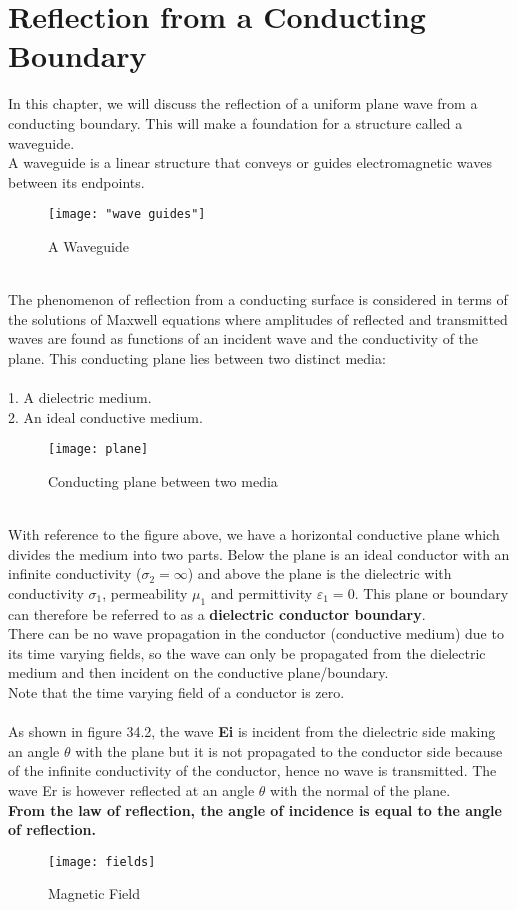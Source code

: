 \chapter{Reflection from a Conducting Boundary}
In this chapter, we will discuss the reflection of a uniform plane wave from a conducting boundary. This will make a foundation for a structure called a waveguide.\\ A waveguide is a linear structure that conveys or guides electromagnetic waves between its endpoints.
\begin{figure}[h]
	\centering
	\texttt{[image: "wave guides"]}
	\caption{A Waveguide}
\end{figure}
\\
 The phenomenon of reflection from a conducting surface is considered in terms of the solutions of Maxwell equations where amplitudes of reflected and transmitted waves are found as functions of an incident wave and the conductivity of the plane. This conducting plane lies between two distinct media: 
\\\\ 1. A dielectric medium.
\\ 2. An ideal conductive medium.
\begin{figure}[h]
\centering
\texttt{[image: plane]}
	\caption{Conducting plane between two media}
\end{figure}
\\
 With reference to the figure above, we have a horizontal conductive plane which divides the medium into two parts. Below the plane is an ideal conductor with an infinite conductivity ($\sigma _2 =\infty$) and above the plane is the dielectric with conductivity $\sigma_1$, permeability $\mu _1$ and	permittivity $ \varepsilon _1 = 0 $. This plane or boundary can therefore be referred to as a \textbf{dielectric conductor boundary}.
 \\
 
 
 There can be no wave propagation in the conductor (conductive medium) due to its time varying fields, so the wave can only be propagated from the dielectric medium and then incident on the conductive plane/boundary.\\ Note that the time varying field of a conductor is zero.\\\\ As shown in figure 34.2, the wave \textbf{Ei}  is incident from the dielectric side making an angle $ \theta $ with the plane but it is not propagated to the
conductor side because of the infinite conductivity of the conductor,
hence no wave is transmitted. The wave Er is however reflected at an
angle $ \theta $ with the normal of the plane.\\ \textbf {From the law of reflection, the
angle of incidence is equal to the angle of reflection.}
\begin{figure}[h]
\centering
\texttt{[image: fields]}
\caption{Magnetic Field}
\end{figure}
\\


